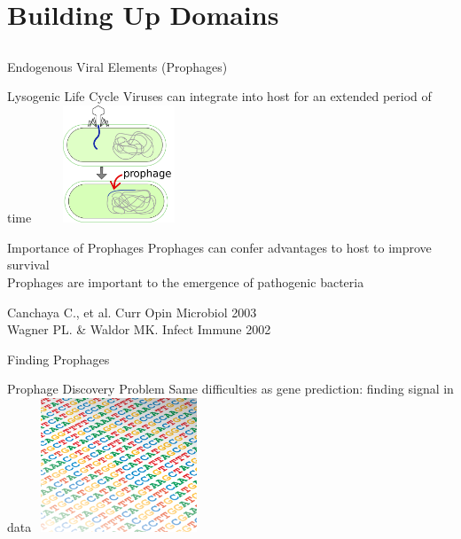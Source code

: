 \documentclass[11pt]{beamer}
\begin{document}
	

\section{Building Up Domains}
\subsection{}
	
	\begin{frame}{Endogenous Viral Elements (Prophages)}
	\begin{block}{Lysogenic Life Cycle}
	Viruses can integrate into host for an extended period of time
	\center
	\vspace{-0.2cm}
	\includegraphics[height=3.5cm, width=5cm]{prophage.png}
	\end{block}
	\begin{block}{Importance of Prophages}
	Prophages can confer advantages to host to improve survival \\ 
	Prophages are important to the emergence of pathogenic bacteria
	\end{block}
	
	\tiny{Canchaya C., et al. Curr Opin Microbiol 2003 \\ Wagner PL. \& Waldor MK. Infect Immune 2002}
	\end{frame}

	\begin{frame}{Finding Prophages}
	\begin{block}{Prophage Discovery Problem}
	Same difficulties as gene prediction: finding signal in data
	\center
	\includegraphics[height=4cm, width=5cm]{dna.png}
	\end{block}
	\end{frame}
	
\end{document}
